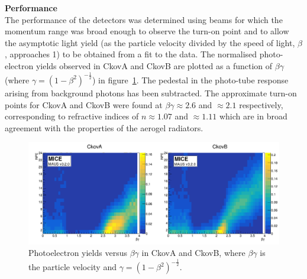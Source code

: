 \noindent\textbf{Performance} \\
\noindent
The performance of the detectors was determined using beams for which
the momentum range was broad enough to observe the turn-on point and to
allow the asymptotic light yield (as the particle velocity divided by the speed of light, $\beta$, approaches 1) to be
obtained from a fit to the data.
The normalised photo-electron yields observed in CkovA and CkovB are
plotted as a function of $\beta\gamma$ (where $\gamma=(1-\beta^2)^{-\frac{1}{2}}$) in
figure~\ref{fig:ckov_betagamma}.
The pedestal in the photo-tube response arising from background
photons has been subtracted.
The approximate turn-on points for CkovA and CkovB were found at
$\beta\gamma \approx 2.6$ and $\approx 2.1$ respectively,
corresponding to refractive indices of $n \approx 1.07$ and $\approx 1.11$ which are in broad agreement with the
properties of the aerogel radiators. 
\begin{figure}[htb]
  \begin{center}
    \includegraphics[width=0.90\columnwidth]{./03-Ckov/Figures/scatter_betagamma_logo.png}
    \caption{Photoelectron yields versus $\beta\gamma$ in CkovA and CkovB,
    where $\beta\gamma$ is the particle velocity and $\gamma=(1-\beta^2)^{-\frac{1}{2}}$.
    }
    \label{fig:ckov_betagamma}
  \end{center}
\end{figure}
